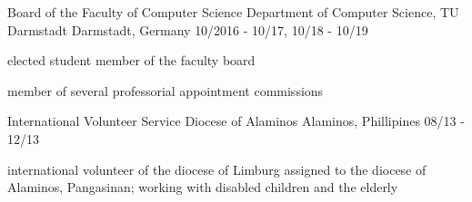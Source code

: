 \begin{cventries}
  \cventry
    {Board of the Faculty of Computer Science} %
    {Department of Computer Science, TU Darmstadt} %
    {Darmstadt, Germany} %
    {10/2016 - 10/17, 10/18 - 10/19} %
    {
      \begin{cvitems} %
        \item {elected student member of the faculty board}
        \item {member of several professorial appointment commissions}
      \end{cvitems}
    }

  \cventry
    {International Volunteer Service} %
    {Diocese of Alaminos} %
    {Alaminos, Phillipines} %
    {08/13 - 12/13} %
    {
      \begin{cvitems} %
        \item {international volunteer of the diocese of Limburg assigned to the diocese of
Alaminos, Pangasinan; working with disabled children and the elderly}
      \end{cvitems}
    }

\end{cventries}
